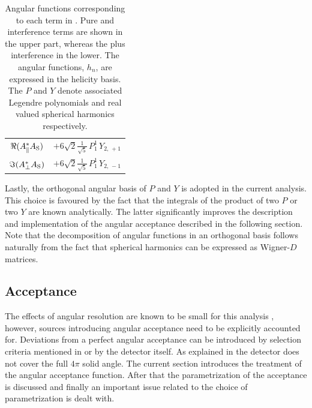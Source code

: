 \begin{table}[t]
\begin{tabular}{cc}
    $\Re({A}_{\parallel}^* {A}_{{\text{S}}})$  &
      $+6\sqrt{2}\tfrac{1}{\sqrt{5}}\, P_1^1\, Y_{2,\,+1}$  \\ %

    $\Im({A}_{\perp}^* {A}_{{\text{S}}})$  &
      $+6\sqrt{2}\tfrac{1}{\sqrt{5}}\, P_1^1\, Y_{2,\,-1}$  \\ %
    \hline
  \end{tabular}
  \caption{Angular functions corresponding to each term in . Pure and interference \pwave terms are shown in the upper part,
    whereas the \swave plus \spwave interference in the lower. The angular functions, $h_n$, are expressed in the helicity basis.
    The $P$ and $Y$ denote associated Legendre polynomials and real valued spherical harmonics respectively.}
  \label{ang_distr}
\end{table}

Lastly, the orthogonal angular basis of $P$ and $Y$ is adopted in the current analysis. 
This choice is favoured by the fact that the integrals of the product of two $P$ or two $Y$ are known analytically. 
The latter significantly improves the description and implementation of the angular acceptance described in the following section.
Note that the decomposition of angular functions in an orthogonal basis follows naturally from the fact that spherical 
harmonics can be expressed as Wigner-$D$ matrices.

\subsection{Acceptance}
\label{Accceptance}

The effects of angular resolution are known to be small for this analysis \cite{tristanThesis},
however, sources introducing angular acceptance need to be explicitly accounted for.
Deviations from a perfect angular acceptance can be introduced by selection criteria mentioned in  or by the detector itself.
As explained in  the \lhcb detector does not cover the full $4\pi$ solid angle.
The current section introduces the treatment of the angular acceptance function. After that the parametrization
of the acceptance is discussed and finally an important issue related to the choice of parametrization is dealt with.

